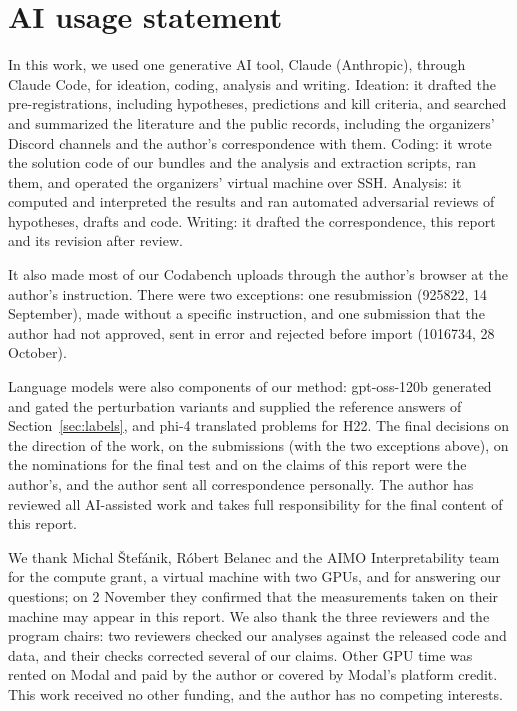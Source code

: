 \documentclass{article}
\begin{document}
\section*{AI usage statement}

In this work, we used one generative AI tool, Claude (Anthropic), through Claude Code, for ideation, coding, analysis and writing. Ideation: it drafted the pre-registrations, including hypotheses, predictions and kill criteria, and searched and summarized the literature and the public records, including the organizers' Discord channels and the author's correspondence with them. Coding: it wrote the solution code of our bundles and the analysis and extraction scripts, ran them, and operated the organizers' virtual machine over SSH. Analysis: it computed and interpreted the results and ran automated adversarial reviews of hypotheses, drafts and code. Writing: it drafted the correspondence, this report and its revision after review.

It also made most of our Codabench uploads through the author's browser at the author's instruction. There were two exceptions: one resubmission (925822, 14 September), made without a specific instruction, and one submission that the author had not approved, sent in error and rejected before import (1016734, 28 October).

Language models were also components of our method: gpt-oss-120b generated and gated the perturbation variants and supplied the reference answers of Section~\ref{sec:labels}, and phi-4 translated problems for H22. The final decisions on the direction of the work, on the submissions (with the two exceptions above), on the nominations for the final test and on the claims of this report were the author's, and the author sent all correspondence personally. The author has reviewed all AI-assisted work and takes full responsibility for the final content of this report.

\begin{ack}
We thank Michal Štefánik, Róbert Belanec and the AIMO Interpretability team for the compute grant, a virtual machine with two GPUs, and for answering our questions; on 2 November they confirmed that the measurements taken on their machine may appear in this report. We also thank the three reviewers and the program chairs: two reviewers checked our analyses against the released code and data, and their checks corrected several of our claims. Other GPU time was rented on Modal and paid by the author or covered by Modal's platform credit. This work received no other funding, and the author has no competing interests.
\end{ack}
\end{document}
